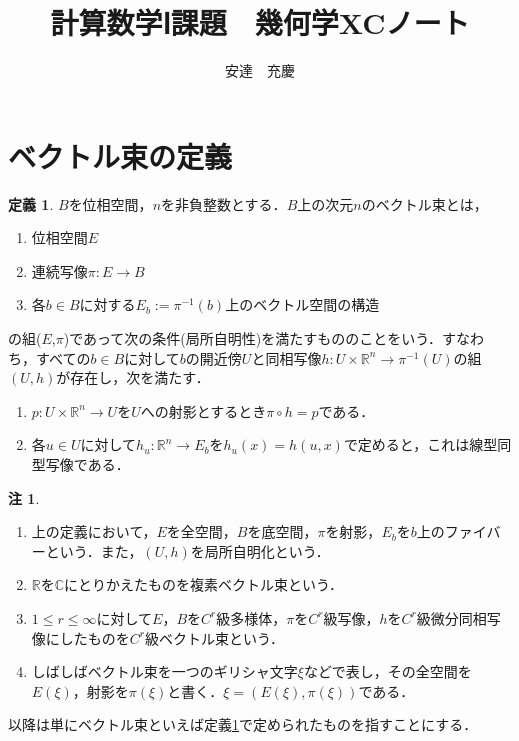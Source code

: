 \documentclass{jsarticle}
\title{計算数学Ⅰ課題　幾何学XCノート}
\author{安達　充慶}
\theoremstyle{definition}
\newtheorem{definition}[theorem]{定義}
\newtheorem{remark}[theorem]{注}
\begin{document}
\maketitle
\section{ベクトル束の定義}
\begin{definition}\label{vbdl}
$B$を位相空間，$n$を非負整数とする．$B$上の次元$n$のベクトル束とは，
\begin{enumerate}
\item 位相空間$E$
\item 連続写像$\pi \colon E \to B$
\item 各$b \in B$に対する$E_b := \pi^{-1}(b)$上のベクトル空間の構造
\end{enumerate}
の組($E$,$\pi$)であって次の条件(局所自明性)を満たすもののことをいう．すなわち，すべての$b \in B$に対して$b$の開近傍$U$と同相写像$h \colon U \times \mathbb{R}^n \to \pi^{-1}(U)$の組$(U,h)$が存在し，次を満たす．
\begin{enumerate}[label=(\arabic*)]
\item $p \colon U \times \mathbb{R}^n \to U$を$U$への射影とするとき$\pi \circ h = p$である．
\item 各$u \in U$に対して$h_u \colon \mathbb{R}^n \to E_b$を$h_u(x) = h(u,x)$で定めると，これは線型同型写像である．
\end{enumerate}
\end{definition}

\begin{remark}
\begin{enumerate}[label=(\arabic*)]
\item 上の定義において，$E$を全空間，$B$を底空間，$\pi$を射影，$E_b$を$b$上のファイバーという．また，$(U,h)$を局所自明化という．
\item $\mathbb{R}$を$\mathbb{C}$にとりかえたものを複素ベクトル束という．
\item $1 \leq r \leq \infty$に対して$E$，$B$を$C^r$級多様体，$\pi$を$C^r$級写像，$h$を$C^r$級微分同相写像にしたものを$C^r$級ベクトル束という．
\item しばしばベクトル束を一つのギリシャ文字$\xi$などで表し，その全空間を$E(\xi)$，射影を$\pi(\xi)$と書く．$\xi = (E(\xi),\pi(\xi))$である．
\end{enumerate}
\end{remark}

以降は単にベクトル束といえば定義\ref{vbdl}で定められたものを指すことにする．
\end{document}
